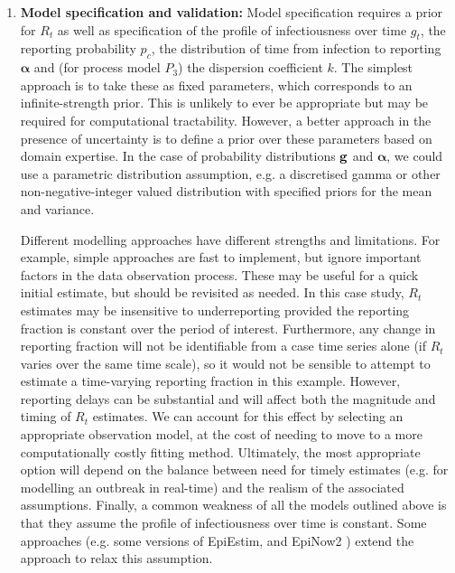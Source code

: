 \documentclass{article}
\begin{document}
\begin{enumerate}
\item \textbf{Model specification and validation:} Model specification requires a prior for $R_t$ as well as specification of the profile of infectiousness over time $g_t$, the reporting probability $p_c$, the distribution of time from infection to reporting $\boldsymbol{\alpha}$ and (for process model $P_3$) the dispersion coefficient $k$. The simplest approach is to take these as fixed parameters, which corresponds to an infinite-strength prior. This is unlikely to ever be appropriate but may be required for computational tractability. However, a better approach in the presence of uncertainty is to define a prior over these parameters based on domain expertise. In the case of probability distributions ${\bf g}$ and $\boldsymbol{\alpha}$, we could use a parametric distribution assumption, e.g. a discretised gamma \citep{charniga2024best,park2024estimating} or other non-negative-integer valued distribution with specified priors for the mean and variance. 

Different modelling approaches have different strengths and limitations. For example, simple approaches are fast to implement, but ignore important factors in the data observation process. These may be useful for a quick initial estimate, but should be revisited as needed. In this case study, $R_t$ estimates may be insensitive to underreporting provided the reporting fraction is constant over the period of interest. Furthermore, any change in reporting fraction will not be identifiable from a case time series alone (if $R_t$ varies over the same time scale), so it would not be sensible to attempt to estimate a time-varying reporting fraction in this example. However, reporting delays can be substantial and will affect both the magnitude and timing of $R_t$ estimates. We can account for this effect by selecting an appropriate observation model, at the cost of needing to move to a more computationally costly fitting method. Ultimately, the most appropriate option will depend on the balance between need for timely estimates (e.g. for modelling an outbreak in real-time) and the realism of the associated assumptions. 
Finally, a common weakness of all the models outlined above is that they assume the profile of infectiousness over time is constant. Some approaches (e.g. some versions of EpiEstim, and EpiNow2 \citep{abbott2020estimating}) extend the approach to relax this assumption.
 

\end{enumerate}
\end{document}
